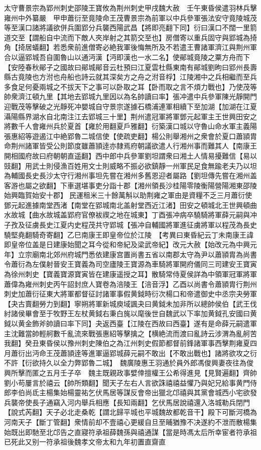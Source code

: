 太守曹景宗為郢州刺史邵陵王寶攸為荆州刺史甲戌魏大赦　壬午東昏侯遣羽林兵擊雍州中外纂嚴　甲申蕭衍至竟陵命王茂曹景宗為前軍以中兵參軍張法安守竟陵城茂等至漢口諸將議欲併兵圍郢分兵襲西陽武昌【將即亮翻下同】衍曰漢口不闊一里箭道交至【謂船自中流而下敵人夾岸射之其箭交至也】房僧寄以重兵固守與郢城為掎角【掎居蟻翻】若悉衆前進僧寄必絶我軍後悔無所及不若遣王曹諸軍濟江與荆州軍合以逼郢城吾自圍魯山以通沔漢【沔即漢也一水二名】使鄖城竟陵之粟方舟而下【安陸春秋鄖子之國故曰鄖城鄖音云杜預曰江夏雲杜縣東南有鄖城劉昫曰郢州長壽縣古竟陵也方泭也舟船也詩云就其深矣方之舟之泭音桴】江陵湘中之兵相繼而至兵多食足何憂兩城之不拔天下之事可以卧取之耳【卧而取之言不煩力戰也】乃使茂等帥衆濟江頓九里【其地去郢城九里因以為名帥讀曰率】張冲遣中兵參軍陳光靜開門迎戰茂等擊破之光靜死冲嬰城自守景宗遂據石橋浦連軍相續下至加湖【加湖在江夏灄陽縣界湖水自北南注江去郢城三十里】荆州遣冠軍將軍鄧元起軍主王世興田安之將數千人會雍州兵於夏首【雍於用翻夏戶雅翻】衍築漢口城以守魯山命水軍主義陽張惠紹等遊遏江中絶郢魯二城信使【使疏吏翻】楊公則舉湘州之衆會於夏口蕭頴胄命荆州諸軍皆受公則節度雖蕭頴逹亦隸焉府朝議欲遣人行湘州事而難其人【南康王開相國府故曰府朝朝直遥翻】西中郎中兵參軍劉坦謂衆曰湘土人情易擾難信【易以豉翻】用武士則侵漁百姓用文士則威略不振必欲鎮靜一州軍民足食無踰老夫乃以坦為輔國長史長沙太守行湘州事坦先嘗在湘州多舊恩迎者屬路【劉坦傳先嘗在湘州盖客游也屬之欲翻】下車選堪事吏分詣十郡【湘州領長沙桂陽零陵衡陽營陽湘東邵陵始興臨賀始安十郡】民運租米三十餘萬斛以助荆雍之軍由是資糧不乏三月蕭衍使鄧元起進據南堂西渚【南堂在郢城南北盖射堂西近江渚】田安之頓城北王世興頓曲水故城【曲水故城盖郢府官僚袚禊之地在城東】丁酉張冲病卒驍騎將軍薛元嗣與冲子孜及征虜長史江夏内史程茂共守郢城【張冲自輔國將軍進征虜將軍以程茂為長史驍堅堯翻騎奇寄翻】乙巳南康王即皇帝位於江陵　【考異曰東昏紀云丁未南康王諱即皇帝位盖是日建康始聞之耳今從和帝紀及梁武帝紀】改元大赦【始改元為中興元年】立宗廟南北郊州府城門悉依建康宫置尚書五省以南郡太守為尹以蕭頴胄為尚書令蕭衍為左僕射晉安王寶義為司空廬陵王寶源為車騎將軍開府儀同三司建安王寶寅為徐州刺史【寶義寶源寶寅皆在建康遥授之耳】散騎常侍夏侯詳為中領軍冠軍將軍蕭偉為雍州刺史丙午詔封庶人寶卷為涪陵王【涪音浮】乙酉以尚書令蕭頴胄行荆州刺史加蕭衍征東大將軍都督征討諸軍事假黄鉞時衍次楊口和帝遣御史中丞宗夬勞軍【夬古賣翻勞力到翻】寧朔將軍新城庾域諷夬曰黄鉞未加非所以總帥侯伯【武王伐紂諸侯畢會至于牧野王左杖黄鉞右秉白旄以麾後世自魏武以下率加黄鉞孔安國曰黄鉞以黄金飾斧帥讀曰率下同】夬返西臺【江陵在西故曰西臺】遂有是命薛元嗣遣軍主沈難當帥輕舸數千亂流來戰張惠紹等擊擒之【横絶流而渡曰亂詩云涉渭為亂舸苦我翻】癸丑東昏侯以豫州刺史陳伯之為江州刺史假節都督前鋒諸軍事西擊荆雍夏四月蕭衍出沔命王茂蕭頴逹等進軍逼郢城薛元嗣不敢出【不敢出戰也】諸將欲攻之衍不許【衍欲持久以全力弊郢魯二城】　魏廣陵惠王羽通於員外郎馮俊興妻夜往為俊興所擊而匿之五月壬子卒　魏主既親政事嬖倖擅權王公希得進見【見賢遍翻】齊帥劉小苟屢言於禧云【帥所類翻】聞天子左右人言欲誅禧禧益懼乃與妃兄給事黄門侍郎李伯尚氐主楊集始楊靈祐乞伏馬居等謀反會帝出獵北邙禧與其黨會城西小宅欲發兵襲帝使長子通竊入河内舉兵相應【長知兩翻】乞伏馬居說禧還入洛城勒兵閉門【說式芮翻】天子必北走桑乾【謂北歸平城也平城魏故都乾音干】殿下可斷河橋為河南天子【斷丁管翻】衆情前却不壹禧心更緩自旦至晡猶豫不决遂約不泄而散楊集始既出即馳至北邙告之直寢符承祖薛魏孫與禧通謀【當是時馮太后所幸宦者符承祖已死此又别一符承祖後魏孝文帝太和九年初置直齋直